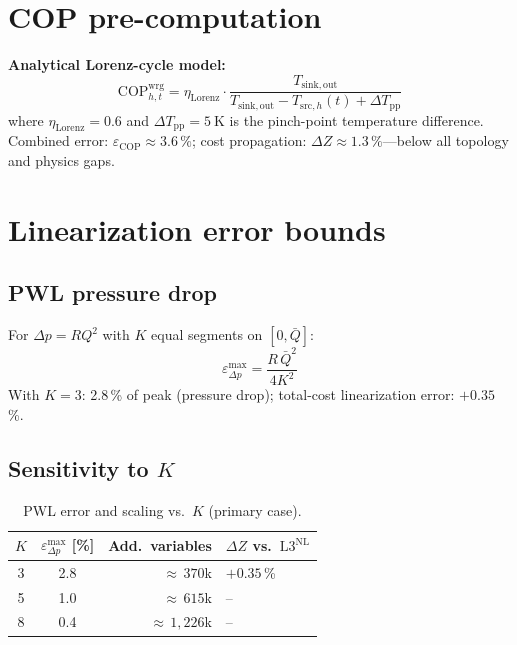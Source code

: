 \documentclass[review,3p]{elsarticle}
\newcommand{\Lnl}{\mathrm{L3}^{\mathrm{NL}}}
\begin{document}
\section{COP pre-computation}
\label{app:cop}

\textbf{Analytical Lorenz-cycle model:}
\begin{equation}
  \mathrm{COP}_{h,t}^{\mathrm{wrg}} = \eta_{\mathrm{Lorenz}}
    \cdot \frac{T_{\mathrm{sink,out}}}{
      T_{\mathrm{sink,out}} - T_{\mathrm{src},h}(t)
      + \Delta T_{\mathrm{pp}}}
\end{equation}
where $\eta_{\mathrm{Lorenz}} = 0.6$ and
$\Delta T_{\mathrm{pp}} = \SI{5}{\kelvin}$ is the pinch-point
temperature difference. Combined error:
$\varepsilon_{\mathrm{COP}} \approx 3.6\,\%$; cost propagation:
$\Delta Z \approx 1.3\,\%$---below all topology and physics gaps.

\section{Linearization error bounds}
\label{app:pwl}

\subsection*{PWL pressure drop}

For $\Delta p = R Q^2$ with $K$ equal segments on $[0, \bar{Q}]$:
\begin{equation*}
  \varepsilon_{\Delta p}^{\max} = \frac{R\, \bar{Q}^2}{4K^2}
\end{equation*}
With $K=3$: 2.8\,\% of peak (pressure drop); total-cost linearization error: $+0.35$\,\%.

\subsection*{Sensitivity to $K$}

\begin{table}[htbp]
\centering
\caption{PWL error and scaling vs.\ $K$ (primary case).}
\label{tab:pwl_sensitivity}
\small
\begin{tabular}{@{} c c r l @{}}
\toprule
$K$ & $\varepsilon_{\Delta p}^{\max}$ [\%]
  & Add.\ variables & $\Delta Z$ vs.\ $\Lnl$ \\
\midrule
3 & 2.8 & ${\approx}\,370$k & $+0.35$\,\% \\
5 & 1.0 & ${\approx}\,615$k & -- \\
8 & 0.4 & ${\approx}\,1{,}226$k & -- \\
\bottomrule
\end{tabular}
\end{table}
\end{document}
